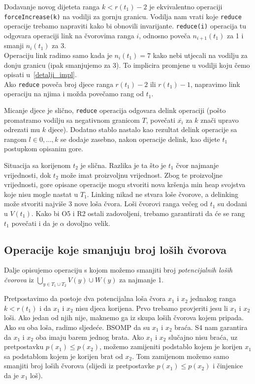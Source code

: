 Dodavanje novog dijeteta ranga $k < r(t_{1}) - 2$ je ekvivalentno operaciji \texttt{forceIncrease(k)} na vodilji za gornju granicu.
Vodilja nam vrati koje \texttt{reduce} operacije trebamo napraviti kako bi obnovili invarijante.
\texttt{reduce(i)} operacija tu odgovara operaciji link na \v{c}vorovima ranga $i$, odnosno pove\v{c}a $n_{i+1}(t_{1})$ za 1 i smanji $n_{i}(t_{1})$ za 3.\\
Operaciju link radimo samo kada je $n_{i}(t_{1}) = 7$ kako nebi utjecali na vodilju za donju granicu (ipak smanjujemo za 3).
To implicira promjene u vodilji koju \v{c}emo opisati u~\ref{detalji_impl}.\\
Ako \texttt{reduce} pove\v{c}a broj djece ranga $r(t_{1}) - 2$ ili $r(t_{1}) - 1$, napravimo link operaciju na njima i mo\v{z}da pove\v{c}amo rang od $t_{1}$.

Micanje djece je sli\v{c}no, \texttt{reduce} operacija odgovara delink operaciji (po\v{s}to promatramo vodilju sa negativnom granicom $T$, pove\v{c}ati $\overline{x_{i}}$ za $k$ zna\v{c}i upravo odrezati mu $k$ djece).
Dodatno stablo nastalo kao rezultat delink operacije sa rangom $l \in {0,\dotsc,k}$ se dodaje zasebno, nakon operacije delink, kao dijete $t_{1}$ postupkom opisanim gore.

Situacija sa korijenom $t_{2}$ je sli\v{c}na.
Razlika je ta \v{s}to je $t_{1}$ \v{c}vor najmanje vrijednosti, dok $t_{2}$ mo\v{z}e imat proizvoljnu vrijednost.
Zbog te proizvoljne vrijednosti, gore opisane operacije mogu stvoriti nova kr\v{s}enja min heap svojstva koje nisu mogle nastat u $T_{1}$.
Linking nikad ne stvara lo\v{s}e \v{c}vorove, a delinking mo\v{z}e stvoriti najvi\v{s}e 3 nove lo\v{s}a \v{c}vora.
Lo\v{s}i \v{c}vorovi ranga ve\v{c}eg od $t_{1}$ su dodani u $V(t_{1})$. Kako bi O5 i R2 ostali zadovoljeni, trebamo garantirati da \'{c}e se rang $t_{1}$ pove\v{c}ati i da je $\alpha$ dovoljno velik.

\subsection{Operacije koje smanjuju broj lo\v{s}ih \v{c}vorova}\label{rm_los}

Dalje opisujemo operaciju s kojom mo\v{z}emo smanjiti broj \emph{potencijalnih lo\v{s}ih \v{c}vorova} iz $\bigcup_{y \in T_{1} \cup T_{2}}V(y) \cup W(y)$ za najmanje 1.

Pretpostavimo da postoje dva potencijalna lo\v{s}a \v{c}vora $x_{1}$ i $x_{2}$ jednakog ranga $k < r(t_{1})$ i da $x_{1}$ i $x_{2}$ nisu djeca korijena.
Prvo trebamo provjeriti jesu li $x_{1}$ i $x_{2}$ lo\v{s}i. Ako jedan od njih nije, maknemo ga iz skupa lo\v{s}ih \v{c}vorova kojem pripada.
Ako su oba lo\v{s}a, radimo sljede\'{c}e.
BSOMP da su $x_{1}$ i $x_{2}$ bra\'{c}a. S4 nam garantira da $x_{1}$ i $x_{2}$ oba imaju barem jednog brata.
Ako $x_{1}$ i $x_{2}$ slu\v{c}ajno nisu bra\'{c}a, uz pretpostavku $p(x_{1}) \le p(x_{2})$, mo\v{z}emo zamijeniti podstablo kojem je korijen $x_{1}$ sa podstablom kojem je korijen brat od $x_{2}$.
Tom zamijenom mo\v{z}emo samo smanjiti broj lo\v{s}ih \v{c}vorova (slijedi iz pretpostavke $p(x_{1}) \le p(x_{2})$ i \v{c}injenice da je $x_{1}$ lo\v{s}).

